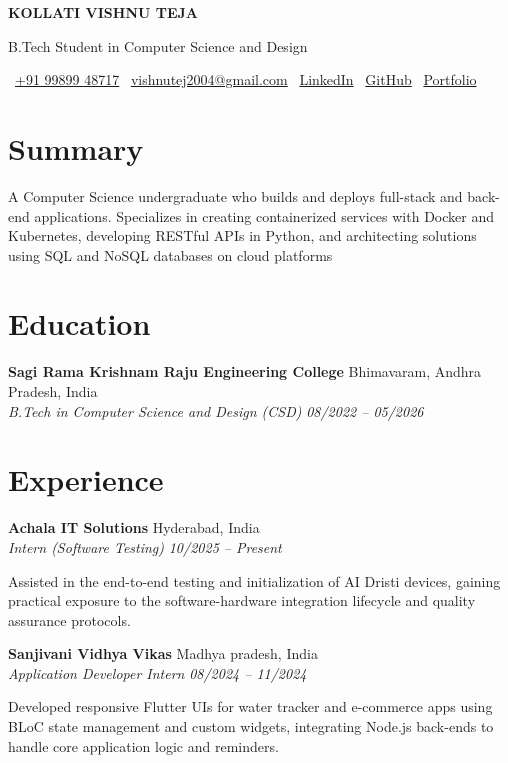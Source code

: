 \documentclass[letterpaper]{article}
\renewcommand{\normalsize}{\fontsize{10pt}{12pt}\selectfont}
\begin{document}
\begin{center}
    \fontsize{17pt}{20pt}\selectfont\textbf{KOLLATI VISHNU TEJA}
    
    \vspace{3pt}
    \normalsize
    B.Tech Student in Computer Science and Design
    
    \vspace{5pt}
    \small
    \faPhone\ \href{tel:+919989948717}{+91 99899 48717} \quad\textbar\quad 
    \faEnvelope\ \href{mailto:vishnutej2004@gmail.com}{vishnutej2004@gmail.com} \quad\textbar\quad 
    \faLinkedin\ \href{https://www.linkedin.com/in/vishnutej0098/}{LinkedIn} \quad\textbar\quad 
    \faGithub\ \href{https://github.com/vishnutej000}{GitHub} \quad\textbar\quad 
    \faGlobe\ \href{https://vishnutej.tech}{Portfolio} \\[3pt]
\end{center}

\section{Summary}
A Computer Science undergraduate who builds and deploys full-stack and back-end applications. Specializes in creating containerized services with Docker and Kubernetes, developing RESTful APIs in Python, and architecting solutions using SQL and NoSQL databases on cloud platforms
\section{Education}
\textbf{Sagi Rama Krishnam Raju Engineering College} \hfill Bhimavaram, Andhra Pradesh, India \\
\textit{B.Tech in Computer Science and Design (CSD)} \hfill \textit{08/2022 -- 05/2026}

\section{Experience}

\textbf{Achala IT Solutions} \hfill Hyderabad, India \\
\textit{Intern (Software Testing)} \hfill \textit{10/2025 -- Present}
\begin{highlights}
\item Assisted in the end-to-end testing and initialization of AI Dristi devices, gaining practical exposure to the software-hardware integration lifecycle and quality assurance protocols.
\end{highlights}
\textbf{Sanjivani Vidhya Vikas } \hfill Madhya pradesh, India \\
\textit{Application Developer Intern} \hfill \textit{08/2024 -- 11/2024}
\begin{highlights}
\item Developed responsive Flutter UIs for water tracker and e-commerce apps using BLoC state management and custom widgets, integrating Node.js back-ends to handle core application logic and reminders.
\end{highlights}
\end{document}
